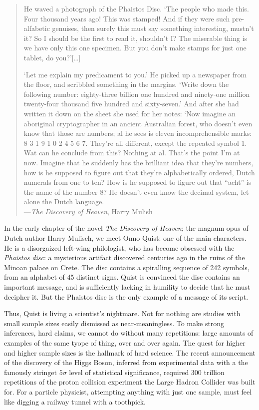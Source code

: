 \begin{quote}
He waved a photograph of the Phaistos Disc. `The people who made this. Four thousand years ago! This was stamped! And if they were such pre-alfabetic genuises, then surely this must say something interesting, mustn't it? So I should be the first to read it, shouldn't I? The miserable thing is we have only this one specimen. But you don't make stamps for just one tablet, do you?'[\ldots]

`Let me explain my predicament to you.' He picked up a newspaper from the floor, and scribbled something in the margins.
`Write down the following number: eighty-three billion one hundred and ninety-one million twenty-four thousand five hundred and sixty-seven.' And after she had written it down on the sheet she used for her notes: `Now imagine an aboriginal cryptographer in an ancient Australian forest, who doesn't even know that those are numbers; al he sees is eleven incomprehensible marks: 8 3 1 9 1 0 2 4 5 6 7. They're all different, except the repeated symbol 1. Wat can he conclude from this? Nothing at al. That's the point I'm at now. Imagine that he suddenly has the brilliant idea that they're numbers, how is he supposed to figure out that they're alphabetically ordered, Dutch numerals from one to ten? How is he supposed to figure out that ``acht'' is the name of the number 8? He doesn't even know the decimal system, let alone the Dutch language.\\
---\emph{The Discovery of Heaven}, Harry Mulish \cite{mulisch1996discovery} 
\end{quote}


In the early chapter of the novel \emph{The Discovery of Heaven}; the magnum opus of Dutch author Harry Mulisch, we meet Onno Quist: one of the main characters. He is a disorgaized left-wing philologist, who has become obsessed with the \emph{Phaistos disc}: a mysterious artifact discovered centuries ago in the ruins of the Minoan palace on Crete. The disc contains a spiralling sequence of 242 symbols, from an alphabet of 45 distinct signs. Quist is convinced the disc contains an important message, and is sufficiently lacking in humility to decide that he must decipher it. But the Phaistos disc is the only example of a message of its script. 

  

Thus, Quist is living a scientist's nightmare. Not for nothing are studies with small sample sizes easily dismissed as near-meaningless. To make strong inferences, hard claims, we cannot do without many repetitions: large amounts of examples of the same tyope of thing, over and over again. The quest for higher and higher sample sizes is the hallmark of hard science. The recent announcement of the discovery of the Higgs Boson, inferred from experimental data with a the famously stringet $5\sigma$ level of statistical significance, required 300 trillion repetitions of the proton collision experiment the Large Hadron Collider was built for. For a particle physicist, attempting anything with just one sample, must feel like digging a railway tunnel with a toothpick.

